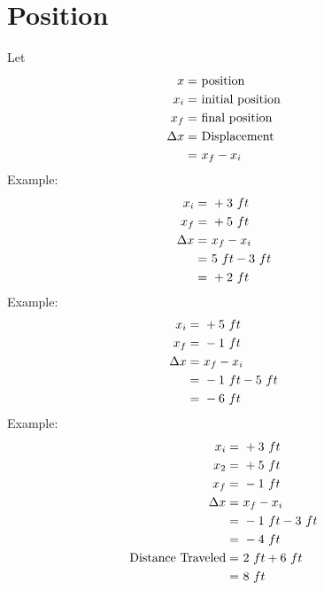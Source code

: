 \section{Position}
	Let
	\begin{align}
		x = \ &\text{position}& \notag \\
		x_{i} = \ &\text{initial position}& \notag \\
		x_{f} = \ &\text{final position}& \notag \\
		\Delta x = \ &\text{Displacement}& \notag \\
		= \ &x_{f}-x_{i} \notag
	\end{align}
	Example:
	\begin{align}
		x_{i} = \ &+3 \ ft& \notag \\
		x_{f} = \ &+5 \ ft& \notag \\
		\Delta x = \ &x_{f} - x_{i}& \notag \\
		= \ &5 \ ft - 3 \ ft& \notag \\
		= \ &+2 \ ft& \notag
	\end{align}
	Example:
	\begin{align}
		x_{i} = \ &+5 \ ft& \notag \\
		x_{f} = \ &-1 \ ft& \notag \\
		\Delta x = \ &x_{f} - x_{i}& \notag \\
		= \ &-1 \ ft -5 \ ft& \notag \\
		= \ &-6 \ ft& \notag
	\end{align}
	Example:
	\begin{align}
		x_{i} = \ &+3 \ ft& \notag \\
		x_{2} = \ &+5 \ ft& \notag \\
		x_{f} = \ &-1 \ ft& \notag \\
		\Delta x = \ &x_{f} - x_{i}& \notag \\
		= \ &-1 \ ft - 3 \ ft& \notag \\
		= \ &-4 \ ft& \notag \\
		\text{Distance Traveled} = \ &2 \ ft + 6 \ ft& \notag \\
		= \ &8 \ ft& \notag
	\end{align}

